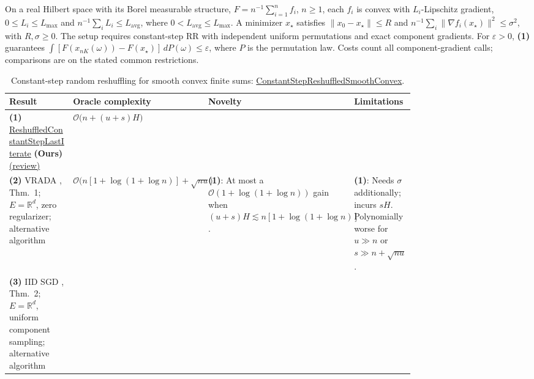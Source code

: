 \begin{table}[tp]
\centering
\caption{Constant-step random reshuffling for smooth convex finite sums: \href{https://github.com/k3nfalt/longtails/blob/main/LongTails/Setups/ConstantStepReshuffledSmoothConvex.lean}{ConstantStepReshuffledSmoothConvex}.}\label{tab:ConstantStepReshuffledSmoothConvex}
\parbox{\linewidth}{\footnotesize On a real Hilbert space with its Borel measurable structure, $F=n^{-1}\sum_{i=1}^n f_i$, $n\geq1$, each $f_i$ is convex with $L_i$-Lipschitz gradient, $0\leq L_i\leq L_{\max}$ and $n^{-1}\sum_iL_i\leq L_{\mathrm{avg}}$, where $0<L_{\mathrm{avg}}\leq L_{\max}$. A minimizer $x_\star$ satisfies $\|x_0-x_\star\|\leq R$ and $n^{-1}\sum_i\|\nabla f_i(x_\star)\|^2\leq\sigma^2$, with $R,\sigma\geq0$. The setup requires constant-step RR with independent uniform permutations and exact component gradients. For $\varepsilon>0$, \textbf{(1)} guarantees $\int [F(x_{nK}(\omega))-F(x_\star)]\,dP(\omega)\leq\varepsilon$, where $P$ is the permutation law. Costs count all component-gradient calls; comparisons are on the stated common restrictions.}\par\smallskip
\begin{threeparttable}
\footnotesize
\setlength{\tabcolsep}{4pt}\renewcommand{\arraystretch}{1.25}
\begin{tabularx}{\linewidth}{@{}>{\raggedright\arraybackslash}p{0.20\linewidth}>{\raggedright\arraybackslash}p{0.32\linewidth}>{\raggedright\arraybackslash}p{0.25\linewidth}>{\raggedright\arraybackslash}X@{}}
\toprule
\textbf{Result} & \textbf{Oracle complexity} & \textbf{Novelty} & \textbf{Limitations} \\
\midrule
\textbf{(1)} \href{https://github.com/k3nfalt/longtails/blob/main/LongTails/Theorems/ReshuffledConstantStepLastIterate.lean}{Reshuffled\allowbreak Constant\allowbreak Step\allowbreak Last\allowbreak Iterate} \textbf{(Ours)} \href{https://github.com/k3nfalt/longtails/blob/main/scripts/reviews/ReshuffledConstantStepLastIterate.md}{(review)}
& $\mathcal{O}\bigl(n+(u+s)H\bigr)$ & & \\
\midrule[1.2pt]
\textbf{(2)} VRADA \citep{csrrSong2021v4}, Thm.~1; $E=\mathbb{R}^d$, zero regularizer; alternative algorithm
& $\mathcal{O}\bigl(n[1+\log(1+\log n)]+\sqrt{nu}\bigr)$
& \textbf{(1)}: At most a $\mathcal{O}(1+\log(1+\log n))$ gain when $(u+s)H\lesssim n[1+\log(1+\log n)]$.
& \textbf{(1)}: Needs $\sigma$ additionally; incurs $sH$. Polynomially worse for $u\gg n$ or $s\gg n+\sqrt{nu}$. \\
\midrule
\textbf{(3)} IID SGD \citep{csrrAttia2025v2}, Thm.~2; $E=\mathbb{R}^d$, uniform component sampling; alternative algorithm

\end{tabularx}
\end{threeparttable}
\end{table}
